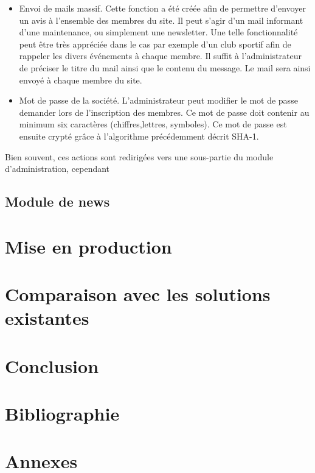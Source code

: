 \documentclass[12pt, a4paper, oneside]{article}
\begin{document}
\begin{itemize}
        \item Envoi de mails massif. Cette fonction a été créée afin de permettre d'envoyer un avis à l'ensemble des membres du site. Il peut s'agir d'un mail informant d'une maintenance, ou simplement une newsletter. Une telle fonctionnalité peut être très appréciée dans le cas par exemple d'un club sportif afin de rappeler les divers événements à chaque membre. Il suffit à l'administrateur de préciser le titre du mail ainsi que le contenu du message. Le mail sera ainsi envoyé à chaque membre du site.
        \item Mot de passe de la société. L'administrateur peut modifier le mot de passe demander lors de l'inscription des membres. Ce mot de passe doit contenir au minimum six caractères (chiffres,lettres, symboles). Ce mot de passe est ensuite crypté grâce à l'algorithme précédemment décrit SHA-1.
    \end{itemize}
    
    Bien souvent, ces actions sont redirigées vers une sous-partie du module d'administration, cependant
     
\subsection{Module de news}
\section{Mise en production}
\section{Comparaison avec les solutions existantes}
\section{Conclusion}
\section{Bibliographie}
%
%
\section{Annexes}
\end{document}
